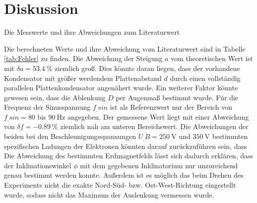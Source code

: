 \section{Diskussion}
\label{sec:Diskussion}

\begin{table}
\centering
\caption{Die Messwerte und ihre Abweichungen zum Literaturwert}

\label{tab:Fehler}
\end{table}

\noindent Die berechneten Werte und ihre Abweichung vom Literaturwert sind in Tabelle \ref{tab:Fehler} zu finden.
Die Abweichung der Steigung $a$ vom theoretischen Wert ist mit $\delta a=\SI{53,4}{\percent}$ ziemlich groß. Dies könnte daran liegen, dass der vorhandene Kondensator mit größer werdendem Plattenabstand $d$ durch einen vollständig parallelen Plattenkondensator angenähert wurde. Ein weiterer Faktor könnte gewesen sein, dass die Ablenkung $D$ per Augenmaß bestimmt wurde.
Für die Frequenz der Sinusspannung $f_.{sin}$ ist als Referenzwert nur der Bereich von $f_.{sin}=80$ bis $\SI{90}{\hertz}$ angegeben. Der gemessene Wert liegt mit einer Abweichung von $\delta f =\SI{-0,89}{\percent}$ ziemlich nah am unteren Bereichswert. 
Die Abweichungen der beiden bei den Beschleunigungsspannungen $U_.B=\SI{250}{\volt}$ und $\SI{350}{\volt}$ bestimmten spezifischen Ladungen der Elektronen könnten darauf zurückzuführen sein, dass
\newline Die Abweichung des bestimmten Erdmagnetfelds lässt sich dadurch erklären, dass der Inklinationswinkel $\phi$ mit dem gegebenen Inklinatorium nur unzureichend genau bestimmt werden konnte. Außerdem ist es möglich das beim Drehen des Experiments nicht die exakte Nord-Süd- bzw. Ost-West-Richtung eingestellt wurde, sodass nicht das Maximum der Auslenkung vermessen wurde.